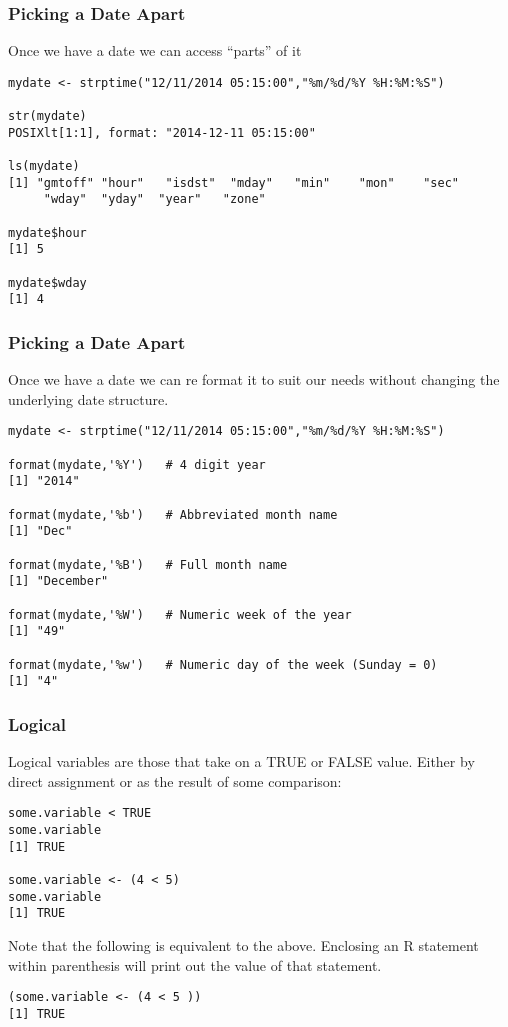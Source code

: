 \documentclass{beamer}
\begin{document}
\begin{frame}[fragile]
\frametitle{Picking a Date Apart}
Once we have a date we can access ``parts'' of it
\newline
\footnotesize
\begin{verbatim}
mydate <- strptime("12/11/2014 05:15:00","%m/%d/%Y %H:%M:%S")

str(mydate)
POSIXlt[1:1], format: "2014-12-11 05:15:00"

ls(mydate)
[1] "gmtoff" "hour"   "isdst"  "mday"   "min"    "mon"    "sec"    
     "wday"  "yday"  "year"   "zone"  

mydate$hour
[1] 5

mydate$wday
[1] 4

\end{verbatim}
\end{frame}


\begin{frame}[fragile]
\frametitle{Picking a Date Apart}
Once we have a date we can re format it to suit our needs without changing the underlying date
structure.
\footnotesize
\begin{verbatim}
mydate <- strptime("12/11/2014 05:15:00","%m/%d/%Y %H:%M:%S")
 
format(mydate,'%Y')   # 4 digit year
[1] "2014"

format(mydate,'%b')   # Abbreviated month name
[1] "Dec"

format(mydate,'%B')   # Full month name
[1] "December"

format(mydate,'%W')   # Numeric week of the year
[1] "49"

format(mydate,'%w')   # Numeric day of the week (Sunday = 0)
[1] "4"

\end{verbatim}
\end{frame}


\begin{frame}[fragile]
\frametitle{Logical}
Logical variables are those that take on a TRUE or FALSE value. Either by direct assignment or as the
result of some comparison:
\footnotesize
\begin{verbatim}
some.variable < TRUE
some.variable
[1] TRUE

some.variable <- (4 < 5)
some.variable 
[1] TRUE
\end{verbatim}
\normalsize
Note that the following is equivalent to the above. Enclosing an R statement  within parenthesis will print out the value of that statement.
\footnotesize
\begin{verbatim}
(some.variable <- (4 < 5 ))
[1] TRUE
\end{verbatim}
\end{frame}
\end{document}
